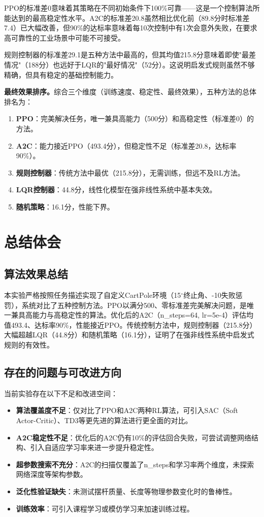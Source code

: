 \documentclass[12pt,a4paper]{ctexart}
\begin{document}
PPO的标准差0意味着其策略在不同初始条件下100\%可靠——这是一个控制算法所能达到的最高稳定性水平。A2C的标准差20.8虽然相比优化前（89.8分时标准差7.4）已大幅改善，但90\%的达标率意味着每10次控制中有1次会意外失败，在要求高可靠性的工业场景中可能不可接受。

规则控制器的标准差29.1是五种方法中最高的，但其均值215.8分意味着即使"最差情况"（188分）也远好于LQR的"最好情况"（52分）。这说明启发式规则虽然不够精确，但具有稳定的基础控制能力。

\textbf{最终效果排序。}综合三个维度（训练速度、稳定性、最终效果），五种方法的总体排名为：
\begin{enumerate}[nosep]
    \item \textbf{PPO}：完美解决任务，唯一兼具高能力（500分）和高稳定性（标准差0）的方法。
    \item \textbf{A2C}：能力接近PPO（493.4分），但稳定性不足（标准差20.8，达标率90\%）。
    \item \textbf{规则控制器}：传统方法中最优（215.8分），无需训练，但远不及RL方法。
    \item \textbf{LQR控制器}：44.8分，线性化模型在强非线性系统中基本失效。
    \item \textbf{随机策略}：16.1分，性能下界。
\end{enumerate}

\section{总结体会}

\subsection{算法效果总结}

本实验严格按照任务描述实现了自定义CartPole环境（15$^\circ$终止角、-10失败惩罚），系统对比了五种控制方法。PPO以满分500、零标准差完美解决问题，是唯一兼具高能力与高稳定性的算法。优化后的A2C（n\_steps=64, lr=5e-4）评估均值493.4、达标率90\%，性能接近PPO。传统控制方法中，规则控制器（215.8分）大幅超越LQR（44.8分）和随机策略（16.1分），证明了在强非线性系统中启发式规则的有效性。

\subsection{存在的问题与可改进方向}

当前实验存在以下不足和改进空间：

\begin{itemize}[nosep]
    \item \textbf{算法覆盖度不足}：仅对比了PPO和A2C两种RL算法，可引入SAC（Soft Actor-Critic）、TD3等更先进的算法进行更全面的对比。
    \item \textbf{A2C稳定性不足}：优化后的A2C仍有10\%的评估回合失败，可尝试调整网络结构、引入自适应学习率来进一步提升稳定性。
    \item \textbf{超参数搜索不充分}：A2C的扫描仅覆盖了n\_steps和学习率两个维度，未探索网络深度等架构参数。
    \item \textbf{泛化性验证缺失}：未测试摆杆质量、长度等物理参数变化时的鲁棒性。
    \item \textbf{训练效率}：可引入课程学习或模仿学习来加速训练过程。
\end{itemize}
\end{document}
